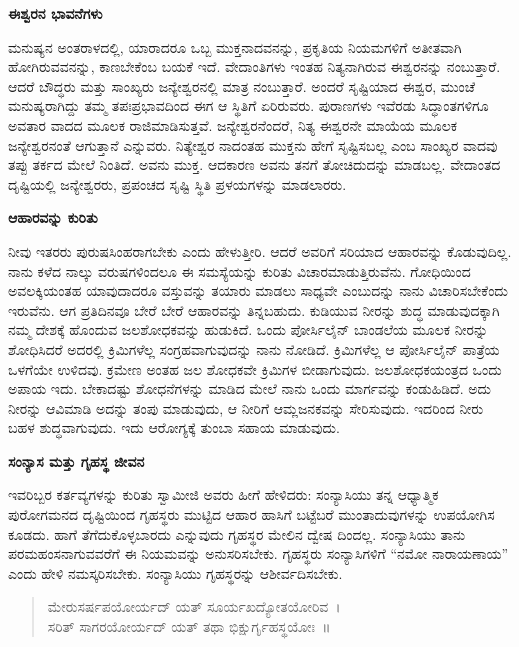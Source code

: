 \begin{center}
\textbf{ಈಶ್ವರನ ಭಾವನೆಗಳು}
\end{center}

ಮನುಷ್ಯನ ಅಂತರಾಳದಲ್ಲಿ, ಯಾರಾದರೂ ಒಬ್ಬ ಮುಕ್ತನಾದವನನ್ನು, ಪ್ರಕೃತಿಯ ನಿಯಮಗಳಿಗೆ ಅತೀತವಾಗಿ ಹೋಗಿರುವವನನ್ನು, ಕಾಣಬೇಕೆಂಬ ಬಯಕೆ ಇದೆ. ವೇದಾಂತಿಗಳು ಇಂತಹ ನಿತ್ಯನಾಗಿರುವ ಈಶ್ವರನನ್ನು ನಂಬುತ್ತಾರೆ. ಆದರೆ ಬೌದ್ಧರು ಮತ್ತು ಸಾಂಖ್ಯರು ಜನ್ಯೇಶ್ವರನಲ್ಲಿ ಮಾತ್ರ ನಂಬುತ್ತಾರೆ. ಅಂದರೆ ಸೃಷ್ಟಿಯಾದ ಈಶ್ವರ, ಮುಂಚೆ ಮನುಷ್ಯರಾಗಿದ್ದು ತಮ್ಮ ತಪಃಪ್ರಭಾವದಿಂದ ಈಗ ಆ ಸ್ಥಿತಿಗೆ ಏರಿರುವರು. ಪುರಾಣಗಳು ಇವೆರಡು ಸಿದ್ಧಾಂತಗಳಿಗೂ ಅವತಾರ ವಾದದ ಮೂಲಕ ರಾಜಿಮಾಡಿಸುತ್ತವೆ. ಜನ್ಯೇಶ್ವರನೆಂದರೆ, ನಿತ್ಯ ಈಶ್ವರನೇ ಮಾಯೆಯ ಮೂಲಕ ಜನ್ಯೇಶ್ವರನಂತೆ ಆಗುತ್ತಾನೆ ಎನ್ನುವರು. ನಿತ್ಯೇಶ್ವರ ನಾದಂತಹ ಮುಕ್ತನು ಹೇಗೆ ಸೃಷ್ಟಿಸಬಲ್ಲ ಎಂಬ ಸಾಂಖ್ಯರ ವಾದವು ತಪ್ಪು ತರ್ಕದ ಮೇಲೆ ನಿಂತಿದೆ. ಅವನು ಮುಕ್ತ. ಆದಕಾರಣ ಅವನು ತನಗೆ ತೋಚಿದುದನ್ನು ಮಾಡಬಲ್ಲ. ವೇದಾಂತದ ದೃಷ್ಟಿಯಲ್ಲಿ ಜನ್ಯೇಶ್ವರರು, ಪ್ರಪಂಚದ ಸೃಷ್ಟಿ ಸ್ಥಿತಿ ಪ್ರಳಯಗಳನ್ನು ಮಾಡಲಾರರು.

\begin{center}
\textbf{ಆಹಾರವನ್ನು ಕುರಿತು}
\end{center}

ನೀವು ಇತರರು ಪುರುಷಸಿಂಹರಾಗಬೇಕು ಎಂದು ಹೇಳುತ್ತೀರಿ. ಆದರೆ ಅವರಿಗೆ ಸರಿಯಾದ ಆಹಾರವನ್ನು ಕೊಡುವುದಿಲ್ಲ. ನಾನು ಕಳೆದ ನಾಲ್ಕು ವರುಷಗಳಿಂದಲೂ ಈ ಸಮಸ್ಯೆಯನ್ನು ಕುರಿತು ವಿಚಾರಮಾಡುತ್ತಿರುವೆನು. ಗೋಧಿಯಿಂದ ಅವಲಕ್ಕಿಯಂತಹ ಯಾವುದಾದರೂ ವಸ್ತುವನ್ನು ತಯಾರು ಮಾಡಲು ಸಾಧ್ಯವೇ ಎಂಬುದನ್ನು ನಾನು ವಿಚಾರಿಸಬೇಕೆಂದು ಇರುವೆನು. ಆಗ ಪ್ರತಿದಿನವೂ ಬೇರೆ ಬೇರೆ ಆಹಾರವನ್ನು ತಿನ್ನಬಹುದು. ಕುಡಿಯುವ ನೀರನ್ನು ಶುದ್ಧ ಮಾಡುವುದಕ್ಕಾಗಿ ನಮ್ಮ ದೇಶಕ್ಕೆ ಹೊಂದುವ ಜಲಶೋಧಕವನ್ನು ಹುಡುಕಿದೆ. ಒಂದು ಪೋರ್ಸಿಲೈನ್​ ಬಾಂಡಲೆಯ ಮೂಲಕ ನೀರನ್ನು ಶೋಧಿಸಿದರೆ ಅದರಲ್ಲಿ ಕ್ರಿಮಿಗಳೆಲ್ಲ ಸಂಗ್ರಹವಾಗುವುದನ್ನು ನಾನು ನೋಡಿದೆ. ಕ್ರಿಮಿಗಳೆಲ್ಲ ಆ ಪೋರ್ಸಿಲೈನ್​ ಪಾತ್ರೆಯ ಒಳಗೆಯೇ ಉಳಿದವು. ಕ್ರಮೇಣ ಅಂತಹ ಜಲ ಶೋಧಕವೇ ಕ್ರಿಮಿಗಳ ಬೀಡಾಗುವುದು. ಜಲಶೋಧಕಯಂತ್ರದ ಒಂದು ಅಪಾಯ ಇದು. ಬೇಕಾದಷ್ಟು ಶೋಧನೆಗಳನ್ನು ಮಾಡಿದ ಮೇಲೆ ನಾನು ಒಂದು ಮಾರ್ಗವನ್ನು ಕಂಡುಹಿಡಿದೆ. ಅದು ನೀರನ್ನು ಆವಿಮಾಡಿ ಅದನ್ನು ತಂಪು ಮಾಡುವುದು, ಆ ನೀರಿಗೆ ಆಮ್ಲಜನಕವನ್ನು ಸೇರಿಸುವುದು. ಇದರಿಂದ ನೀರು ಬಹಳ ಶುದ್ಧವಾಗುವುದು. ಇದು ಆರೋಗ್ಯಕ್ಕೆ ತುಂಬಾ ಸಹಾಯ ಮಾಡುವುದು.

\begin{center}
\textbf{ಸಂನ್ಯಾಸ ಮತ್ತು ಗೃಹಸ್ಥ ಜೀವನ}
\end{center}

ಇವರಿಬ್ಬರ ಕರ್ತವ್ಯಗಳನ್ನು ಕುರಿತು ಸ್ವಾಮೀಜಿ ಅವರು ಹೀಗೆ ಹೇಳಿದರು: ಸಂನ್ಯಾಸಿಯು ತನ್ನ ಆಧ್ಯಾತ್ಮಿಕ ಪುರೋಗಮನದ ದೃಷ್ಟಿಯಿಂದ ಗೃಹಸ್ಥರು ಮುಟ್ಟಿದ ಆಹಾರ ಹಾಸಿಗೆ ಬಟ್ಟೆಬರೆ ಮುಂತಾದುವುಗಳನ್ನು ಉಪಯೋಗಿಸ ಕೂಡದು. ಹಾಗೆ ತೆಗೆದುಕೊಳ್ಳಬಾರದು ಎನ್ನುವುದು ಗೃಹಸ್ಥರ ಮೇಲಿನ ದ್ವೇಷ ದಿಂದಲ್ಲ. ಸಂನ್ಯಾಸಿಯು ತಾನು ಪರಮಹಂಸನಾಗುವವರೆಗೆ ಈ ನಿಯಮವನ್ನು ಅನುಸರಿಸಬೇಕು. ಗೃಹಸ್ಥರು ಸಂನ್ಯಾಸಿಗಳಿಗೆ “ನಮೋ ನಾರಾಯಣಾಯ” ಎಂದು ಹೇಳಿ ನಮಸ್ಕರಿಸಬೇಕು. ಸಂನ್ಯಾಸಿಯು ಗೃಹಸ್ಥರನ್ನು ಆಶೀರ್ವದಿಸಬೇಕು.

\begin{verse}
ಮೇರುಸರ್ಷಪಯೋರ್ಯದ್​ ಯತ್​ ಸೂರ್ಯಖದ್ಯೋತಯೋರಿವ~।\\ಸರಿತ್​ ಸಾಗರಯೋರ್ಯದ್​ ಯತ್​ ತಥಾ ಭಿಕ್ಷುರ್ಗೃಹಸ್ಥಯೋಃ~॥
\end{verse}

